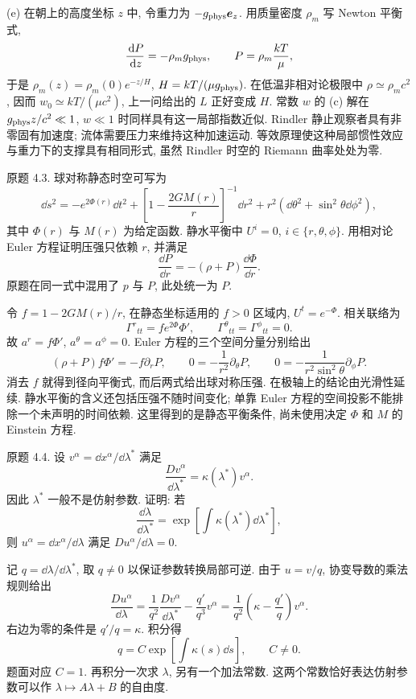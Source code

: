 \begin{solution}
(e) 在朝上的高度坐标 $z$ 中, 令重力为 $-g_{\rm phys}\boldsymbol e_z$. 用质量密度 $\rho_m$ 写 Newton 平衡式,
\[
\frac{\,\mathrm d P}{\,\mathrm d z}=-\rho_mg_{\rm phys},\qquad
P=\rho_m\frac{kT}{\mu},
\]
于是 $\rho_m(z)=\rho_m(0)e^{-z/H}$, $H=kT/(\mu g_{\rm phys})$. 在低温非相对论极限中 $\rho\simeq\rho_mc^2$, 因而 $w_0\simeq kT/(\mu c^2)$, 上一问给出的 $L$ 正好变成 $H$. 常数 $w$ 的 (c) 解在 $g_{\rm phys}z/c^2\ll1$, $w\ll1$ 时同样具有这一局部指数近似. Rindler 静止观察者具有非零固有加速度; 流体需要压力来维持这种加速运动. 等效原理使这种局部惯性效应与重力下的支撑具有相同形式, 虽然 Rindler 时空的 Riemann 曲率处处为零.
\end{solution}

\begin{exercise}
原题 4.3. 球对称静态时空可写为
\[
\dd s^2=-e^{2\Phi(r)}\dd t^2+
\left[1-\frac{2GM(r)}r\right]^{-1}\dd r^2
+r^2(\dd\theta^2+\sin^2\theta\dd\phi^2),
\]
其中 $\Phi(r)$ 与 $M(r)$ 为给定函数. 静水平衡中 $U^i=0$, $i\in\{r,\theta,\phi\}$. 用相对论 Euler 方程证明压强只依赖 $r$, 并满足
\[
\frac{\dd P}{\dd r}=-(\rho+P)\frac{\dd\Phi}{\dd r}.
\]
原题在同一式中混用了 $p$ 与 $P$, 此处统一为 $P$.
\end{exercise}
\begin{solution}
令 $f=1-2GM(r)/r$, 在静态坐标适用的 $f>0$ 区域内, $U^t=e^{-\Phi}$. 相关联络为
\[
\Gamma^r{}_{tt}=fe^{2\Phi}\Phi',\qquad
\Gamma^\theta{}_{tt}=\Gamma^\phi{}_{tt}=0.
\]
故 $a^r=f\Phi'$, $a^\theta=a^\phi=0$. Euler 方程的三个空间分量分别给出
\[
(\rho+P)f\Phi'=-f\partial_rP,\qquad
0=-\frac1{r^2}\partial_\theta P,\qquad
0=-\frac1{r^2\sin^2\theta}\partial_\phi P.
\]
消去 $f$ 就得到径向平衡式, 而后两式给出球对称压强. 在极轴上的结论由光滑性延续. 静水平衡的含义还包括压强不随时间变化; 单靠 Euler 方程的空间投影不能排除一个未声明的时间依赖. 这里得到的是静态平衡条件, 尚未使用决定 $\Phi$ 和 $M$ 的 Einstein 方程.
\end{solution}

\begin{exercise}
原题 4.4. 设 $v^\alpha=\dd x^\alpha/\dd\lambda^*$ 满足
\[
\frac{Dv^\alpha}{\dd\lambda^*}=\kappa(\lambda^*)v^\alpha.
\]
因此 $\lambda^*$ 一般不是仿射参数. 证明: 若
\[
\frac{\dd\lambda}{\dd\lambda^*}
=\exp\left[\int\kappa(\lambda^*)\dd\lambda^*\right],
\]
则 $u^\alpha=\dd x^\alpha/\dd\lambda$ 满足 $Du^\alpha/\dd\lambda=0$.
\end{exercise}
\begin{solution}
记 $q=\dd\lambda/\dd\lambda^*$, 取 $q\ne0$ 以保证参数转换局部可逆. 由于 $u=v/q$, 协变导数的乘法规则给出
\[
\frac{Du^\alpha}{\dd\lambda}
=\frac1{q^2}\frac{Dv^\alpha}{\dd\lambda^*}
-\frac{q'}{q^3}v^\alpha
=\frac1{q^2}\left(\kappa-\frac{q'}q\right)v^\alpha.
\]
右边为零的条件是 $q'/q=\kappa$. 积分得
\[
q=C\exp\left[\int\kappa(s)\dd s\right],\qquad C\ne0.
\]
题面对应 $C=1$. 再积分一次求 $\lambda$, 另有一个加法常数. 这两个常数恰好表达仿射参数可以作 $\lambda\mapsto A\lambda+B$ 的自由度.
\end{solution}

